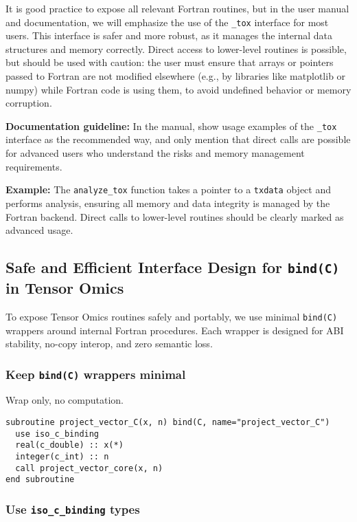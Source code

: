 \documentclass{article}
\begin{document}
It is good practice to expose all relevant Fortran routines, but in the user manual and documentation, we will emphasize the use of the \texttt{\_tox} interface for most users. This interface is safer and more robust, as it manages the internal data structures and memory correctly. Direct access to lower-level routines is possible, but should be used with caution: the user must ensure that arrays or pointers passed to Fortran are not modified elsewhere (e.g., by libraries like matplotlib or numpy) while Fortran code is using them, to avoid undefined behavior or memory corruption.

\textbf{Documentation guideline:} In the manual, show usage examples of the \texttt{\_tox} interface as the recommended way, and only mention that direct calls are possible for advanced users who understand the risks and memory management requirements.

\textbf{Example:} The \texttt{analyze\_tox} function takes a pointer to a \texttt{txdata} object and performs analysis, ensuring all memory and data integrity is managed by the Fortran backend. Direct calls to lower-level routines should be clearly marked as advanced usage.


\subsection{Safe and Efficient Interface Design for \texttt{bind(C)} in Tensor Omics}


To expose Tensor Omics routines safely and portably, we use minimal \texttt{bind(C)} wrappers around internal Fortran procedures. Each wrapper is designed for ABI stability, no-copy interop, and zero semantic loss.

\subsubsection{Keep \texttt{bind(C)} wrappers minimal}

Wrap only, no computation.

\begin{verbatim}
subroutine project_vector_C(x, n) bind(C, name="project_vector_C")
  use iso_c_binding
  real(c_double) :: x(*)
  integer(c_int) :: n
  call project_vector_core(x, n)
end subroutine
\end{verbatim}

\subsubsection{Use \texttt{iso\_c\_binding} types}
\end{document}
